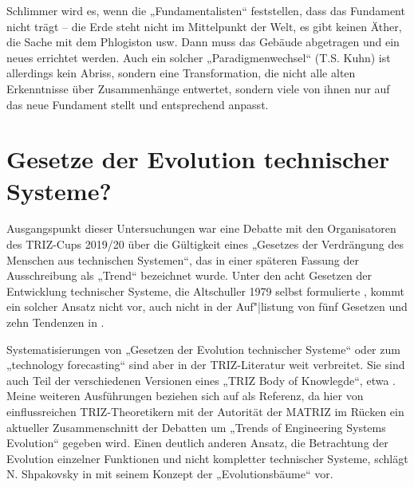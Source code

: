 \documentclass[12pt,a4paper]{article}
\begin{document}
Schlimmer wird es, wenn die „Fundamentalisten“ feststellen, dass das Fundament
nicht trägt -- die Erde steht nicht im Mittelpunkt der Welt, es gibt keinen
Äther, die Sache mit dem Phlogiston usw.  Dann muss das Gebäude abgetragen und
ein neues errichtet werden.  Auch ein solcher „Paradigmenwechsel“ (T.S. Kuhn)
ist allerdings kein Abriss, sondern eine Transformation, die nicht alle alten
Erkenntnisse über Zusammenhänge entwertet, sondern viele von ihnen nur auf das
neue Fundament stellt und entsprechend anpasst.

\section{Gesetze der Evolution technischer Systeme?}

Ausgangspunkt dieser Untersuchungen war eine Debatte mit den Organisatoren des
TRIZ-Cups 2019/20 über die Gültigkeit eines „Gesetzes der Verdrängung des
Menschen aus technischen Systemen“, das in einer späteren Fassung der
Ausschreibung als „Trend“ bezeichnet wurde. Unter den acht Gesetzen der
Entwicklung technischer Systeme, die Altschuller 1979 selbst formulierte
\cite[S. 2]{TESE2018}, kommt ein solcher Ansatz nicht vor, auch nicht in der
Auf"|listung von fünf Gesetzen und zehn Tendenzen in
\cite[S. 148\,ff.]{KS2017}.  

Systematisierungen von „Gesetzen der Evolution technischer Systeme“ oder zum
„technology forecasting“ sind aber in der TRIZ-Literatur weit verbreitet. Sie
sind auch Teil der verschiedenen Versionen eines „TRIZ Body of Knowlegde“,
etwa \cite{TBK-2007}. Meine weiteren Ausführungen beziehen sich auf
\cite{TESE2018} als Referenz, da hier von einflussreichen TRIZ-Theoretikern
mit der Autorität der MATRIZ im Rücken ein aktueller Zusammenschnitt der
Debatten um „Trends of Engineering Systems Evolution“ gegeben wird. Einen
deutlich anderen Ansatz, die Betrachtung der Evolution einzelner Funktionen
und nicht kompletter technischer Systeme, schlägt N. Shpakovsky in
\cite{Shpakovsky2010} mit seinem Konzept der „Evolutionsbäume“ vor.
\end{document}
